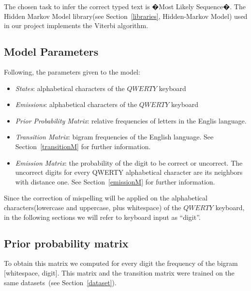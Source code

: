 \documentclass[12pt]{article}
\begin{document}
The chosen task to infer the correct typed text is �Most Likely Sequence�. The
Hidden Markov Model library(see Section~\ref{libraries}, Hidden-Markov Model) used in our
project implements the Viterbi algorithm.
 
\subsection{Model Parameters}
Following, the parameters given to the model:
\begin{itemize}
	\item[]\emph{States}: alphabetical characters of the $QWERTY$ keyboard
	\item[]\emph{Emissions}: alphabetical characters of the $QWERTY$ keyboard
	\item[]\emph{Prior Probability Matrix}: relative frequencies of letters in the
	Englis language.
	\item[]\emph{Transition Matrix}: bigram frequencies of the English language. 
	See Section~\ref{transitionM} for further information.
	\item[]\emph{Emission Matrix}: the probability of the digit to be correct or
	uncorrect. The uncorrect digits for every QWERTY alphabetical character are its
	neighbors with distance one. See Section~\ref{emissionM} for further
	information.
\end{itemize}
Since the correction of mispelling will be applied on the alphabetical
characters(lowercase and uppercase, plus whitespace) of the $QWERTY$ keyboard,
in the following sections we will refer to keyboard input as ``digit''.
\subsection{Prior probability matrix}
To obtain this matrix we computed for every digit the frequency of the bigram
[whitespace, digit]. This matrix and the transition matrix were trained on the
same datasets~(see Section~\ref{dataset}).
\end{document}
